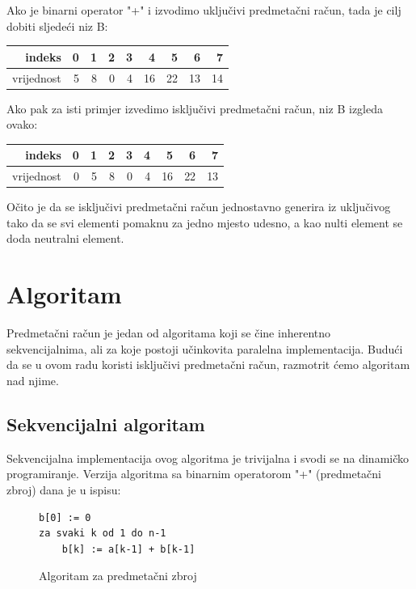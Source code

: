 \documentclass[times, utf8, zavrsni, numeric]{fer}
\begin{document}
Ako je binarni operator "+" i izvodimo uključivi predmetačni račun, tada je cilj dobiti sljedeći niz B:
\begin{center}
\begin{tabular}{| r | r | r | r | r | r | r | r | r |}
\hline
indeks & 0 & 1 & 2 & 3 & 4 & 5 & 6 & 7\\
\hline
vrijednost & 5 & 8 & 0 & 4 & 16 & 22 & 13 & 14\\
\hline
\end{tabular}
\end{center}
Ako pak za isti primjer izvedimo isključivi predmetačni račun, niz B izgleda ovako:
\begin{center}
\begin{tabular}{| r | r | r | r | r | r | r | r | r |}
\hline
\cellcolor{lightgray}indeks & \cellcolor{lightgray}0 & \cellcolor{lightgray}1 & \cellcolor{lightgray}2 & \cellcolor{lightgray}3 & \cellcolor{lightgray}4 & \cellcolor{lightgray}5 & \cellcolor{lightgray}6 & \cellcolor{lightgray}7 \\
\hline
vrijednost & 0 & 5 & 8 & 0 & 4 & 16 & 22 & 13\\
\hline
\end{tabular}
\end{center}

Očito je da se isključivi predmetačni račun jednostavno generira iz uključivog tako da se svi elementi pomaknu za jedno mjesto udesno, a kao nulti element se doda neutralni element.


\section{Algoritam}

\indent

Predmetačni račun je jedan od algoritama koji se čine inherentno sekvencijalnima, ali za koje postoji učinkovita paralelna implementacija. Budući da se u ovom radu koristi isključivi predmetačni račun, razmotrit ćemo algoritam nad njime.

\subsection{Sekvencijalni algoritam}

\indent

Sekvencijalna implementacija ovog algoritma je trivijalna i svodi se na dinamičko programiranje. Verzija algoritma sa binarnim operatorom "+" (predmetačni zbroj) dana je u ispisu:

\begin{figure}[hbt]
\begin{singlespace}
\begin{lstlisting}[label={predmetacni zbroj}]
b[0] := 0
za svaki k od 1 do n-1
	b[k] := a[k-1] + b[k-1]
\end{lstlisting}
\end{singlespace}
\caption{Algoritam za predmetačni zbroj}
\label{prefixsumalgoritam}
\end{figure}
\end{document}
